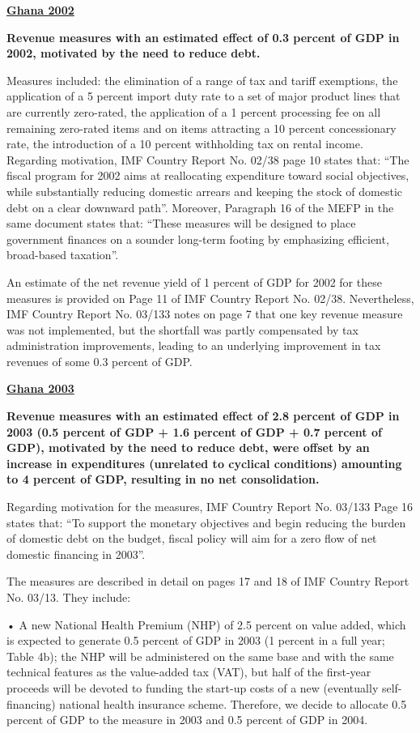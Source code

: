 \textbf{\underline{Ghana 2002}}

\textbf{Revenue measures with an estimated effect of 0.3 percent of GDP in 2002, motivated by the need to reduce debt.}

Measures included: the elimination of a range of tax and tariff exemptions, the application of a 5 percent import duty rate to a set of major product lines that are currently zero-rated, the application of a 1 percent processing fee on all remaining zero-rated items and on items attracting a 10 percent concessionary rate, the introduction of a 10 percent withholding tax on rental income. 
Regarding motivation, IMF Country Report No. 02/38 page 10 states that: “The fiscal program for 2002 aims at reallocating expenditure toward social objectives, while substantially reducing domestic arrears and keeping the stock of domestic debt on a clear downward path”. Moreover, Paragraph 16 of the MEFP in the same document states that: “These measures will be designed to place government finances on a sounder long-term footing by emphasizing efficient, broad-based taxation”.

An estimate of the net revenue yield of 1 percent of GDP for 2002 for these measures is provided on Page 11 of IMF Country Report No. 02/38. Nevertheless, IMF Country Report No. 03/133 notes on  page 7 that one key revenue measure was not implemented, but the shortfall was partly compensated by tax administration improvements, leading to an underlying improvement in tax revenues of some 0.3 percent of GDP.

\textbf{\underline{Ghana 2003}}

\textbf{Revenue measures with an estimated effect of 2.8 percent of GDP in 2003 (0.5 percent of GDP + 1.6 percent of GDP + 0.7 percent of GDP), motivated by the need to reduce debt, were offset by an increase in expenditures (unrelated to cyclical conditions) amounting to 4 percent of GDP, resulting in no net consolidation.}

Regarding motivation for the measures, IMF Country Report No. 03/133 Page 16 states that: “To support the monetary objectives and begin reducing the burden of domestic debt on the budget, fiscal policy will aim for a zero flow of net domestic financing in 2003”.

The measures are described in detail on pages 17 and 18 of IMF Country Report No. 03/13. They include:

•	A new National Health Premium (NHP) of 2.5 percent on value added, which is expected to generate 0.5 percent of GDP in 2003 (1 percent in a full year; Table 4b); the NHP will be administered on the same base and with the same technical features as the value-added tax (VAT), but half of the first-year proceeds will be devoted to funding the start-up costs of a new (eventually self-financing) national health insurance scheme. Therefore, we decide to allocate 0.5 percent of GDP to the measure in 2003 and 0.5 percent of GDP in 2004. 

